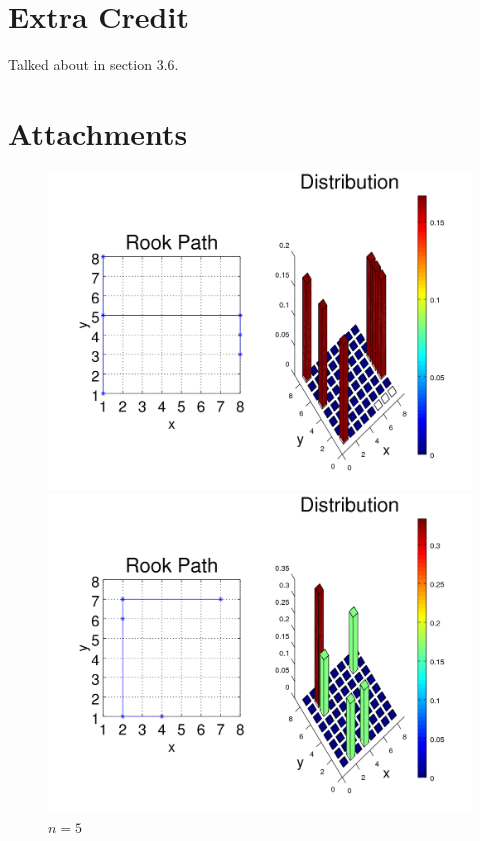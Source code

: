 \documentclass{amsart}
\numberwithin{equation}{section}
\begin{document}
\section{Extra Credit}
Talked about in section 3.6.

\newpage
\section{Attachments}

\begin{figure}[!h]
    \centering
   \begin{minipage}{0.50\textwidth}
     \centering
     \includegraphics[width=1.0\linewidth]{figures/regular/figure_Rook_path_n5_x1_y1.png}
     \captionsetup{labelformat=empty}
     \caption*{$n=5$}
   \end{minipage}\hfil
   \begin{minipage}{0.50\textwidth}
     \centering
     \includegraphics[width=1.0\linewidth]{figures/regular/figure_Rook_path_n5_x4_y1.png}

\end{minipage}
\end{figure}
\end{document}

